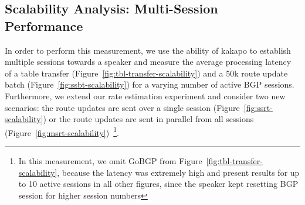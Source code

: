 \subsection{Scalability Analysis: Multi-Session Performance}
In order to perform this measurement, we use the ability of kakapo to establish multiple sessions towards a speaker and measure the average processing latency of a table transfer (Figure~\ref{fig:tbl-transfer-scalability}) and a 50k route update batch (Figure~\ref{fig:ssbt-scalability}) for a varying number of active BGP sessions.
Furthermore, we extend our rate estimation experiment and consider two new scenarios: the route updates are sent over a single session (Figure~\ref{fig:ssrt-scalability}) or the route updates are sent in parallel from all sessions (Figure~\ref{fig:msrt-scalability})~\footnote{In this measurement, we omit GoBGP from Figure~\ref{fig:tbl-transfer-scalability}, because the latency was extremely high and present results for up to 10 active sessions in all other figures, since the speaker kept resetting BGP session for higher session numbers}.

